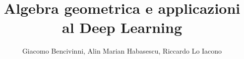 \documentclass{beamer}
\title{Algebra geometrica e applicazioni al Deep Learning}
\author{Giacomo Bencivinni, Alin Marian Habasescu, Riccardo Lo Iacono}
\begin{document}
\begin{frame}
    \maketitle
\end{frame}



\end{document}
